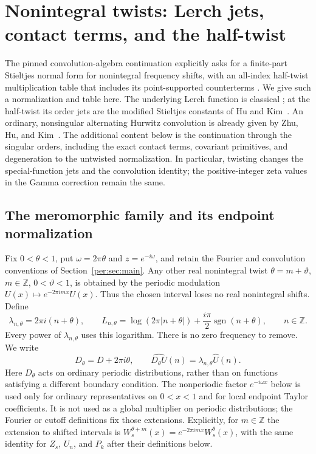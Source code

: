 \section{Nonintegral twists: Lerch jets, contact terms, and the half-twist}
\label{tw:sec:main}

The pinned convolution-algebra continuation explicitly asks for a
finite-part Stieltjes normal form for nonintegral frequency shifts, with
an all-index half-twist multiplication table that includes its
point-supported counterterms
\cite[``Twists, characters, and alternate endpoint normalizations'']{RepoConvolutionAlgebra}.
We give such a normalization and table here. The underlying Lerch
function is classical \cite[\S25.14]{DLMFLerch}; at the half-twist its
order jets are the modified Stieltjes constants of Hu and
Kim~\cite{HuKim2022}. An ordinary, nonsingular alternating Hurwitz
convolution is already given by Zhu, Hu, and
Kim~\cite[Theorem~1.13]{ZhuHuKim2026}. The additional content below is
the continuation through the singular orders, including the exact
contact terms, covariant primitives, and degeneration to the untwisted
normalization. In particular, twisting changes the special-function
jets and the convolution identity; the positive-integer zeta values in
the Gamma correction remain the same.

\subsection{The meromorphic family and its endpoint normalization}

Fix $0<\theta<1$, put $\omega=2\pi\theta$ and $z=e^{-i\omega}$, and
retain the Fourier and convolution conventions of
Section~\ref{per:sec:main}. Any other real nonintegral twist
$\theta=m+\vartheta$, $m\in\mathbb Z$, $0<\vartheta<1$, is obtained
by the periodic modulation $U(x)\mapsto e^{-2\pi imx}U(x)$.
Thus the chosen interval loses no real nonintegral shifts. Define
\begin{equation}\label{tw:eq:lambda}
 \lambda_{n,\theta}=2\pi i(n+\theta),\qquad
 L_{n,\theta}=\log(2\pi|n+\theta|)
                      +\frac{i\pi}{2}\operatorname{sgn}(n+\theta),
 \qquad n\in\mathbb Z.
\end{equation}
Every power of $\lambda_{n,\theta}$ uses this logarithm. There is no
zero frequency to remove. We write
\[
 D_\theta=D+2\pi i\theta,
 \qquad \widehat{D_\theta U}(n)=\lambda_{n,\theta}\widehat U(n).
\]
Here $D_\theta$ acts on ordinary periodic distributions, rather than on
functions satisfying a different boundary condition.
The nonperiodic factor $e^{-i\omega x}$ below is used only for
ordinary representatives on $0<x<1$ and for local endpoint Taylor
coefficients. It is not used as a global multiplier on periodic
distributions; the Fourier or cutoff definitions fix those extensions.
Explicitly, for $m\in\mathbb Z$ the extension to shifted intervals is
$W_s^{\theta+m}(x)=e^{-2\pi imx}W_s^\theta(x)$, with the same identity
for $Z_s$, $U_n$, and $P_k$ after their definitions below.

